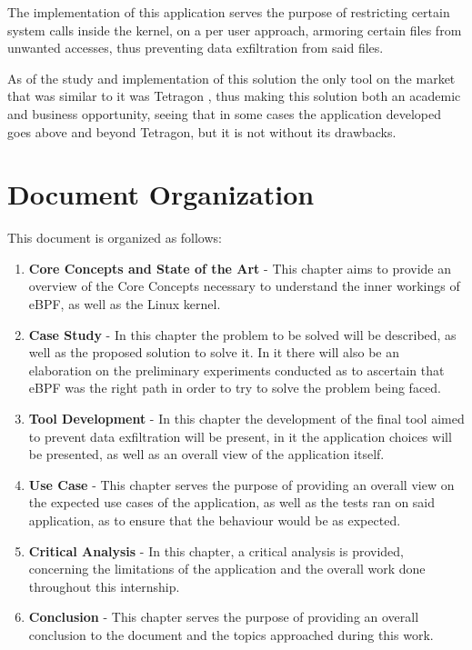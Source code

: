 The implementation of this application serves the purpose of restricting certain system calls inside the kernel, on a per user approach, armoring certain files from unwanted accesses, thus preventing data exfiltration from said files.

As of the study and implementation of this solution the only tool on the market that was similar to it was Tetragon \cite{tetragon}, thus making this solution both an academic and business opportunity, seeing that in some cases the application developed goes above and beyond Tetragon, but it is not without its drawbacks.


\section{Document Organization}

This document is organized as follows:
\begin{enumerate}
	\item \textbf{Core Concepts and State of the Art} - This chapter aims to provide an overview of the Core Concepts necessary to understand the inner workings of eBPF, as well as the Linux kernel.
	\item \textbf{Case Study} - In this chapter the problem to be solved will be described, as well as the proposed solution to solve it. In it there will also be an elaboration on the preliminary experiments conducted as to ascertain that eBPF was the right path in order to try to solve the problem being faced.
	\item \textbf{Tool Development} - In this chapter the development of the final tool aimed to prevent data exfiltration will be present, in it the application choices will be presented, as well as an overall view of the application itself.
	\item \textbf{Use Case} - This chapter serves the purpose of providing an overall view on the expected use cases of the application, as well as the tests ran on said application, as to ensure that the behaviour would be as expected.
	\item \textbf{Critical Analysis} - In this chapter, a critical analysis is provided, concerning the limitations of the application and the overall work done throughout this internship.
	\item \textbf{Conclusion} - This chapter serves the purpose of providing an overall conclusion to the document and the topics approached during this work.
\end{enumerate}


